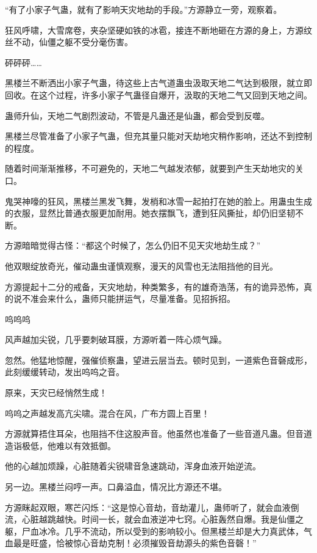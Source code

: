 
\begin{this_body}

“有了小家子气蛊，就有了影响天灾地劫的手段。”方源静立一旁，观察着。

狂风呼啸，大雪席卷，夹杂坚硬如铁的冰雹，接连不断地砸在方源的身上，方源纹丝不动，仙僵之躯不受分毫伤害。

砰砰砰……

黑楼兰不断洒出小家子气蛊，待这些上古气道蛊虫汲取天地二气达到极限，就立即回收。在这个过程，许多小家子气蛊径自爆开，汲取的天地二气又回到天地之间。

蛊师升仙，天地二气剧烈波动，不管是凡蛊还是仙蛊，都会受到反噬。

黑楼兰尽管准备了小家子气蛊，但充其量只能对天劫地灾稍作影响，还达不到控制的程度。

随着时间渐渐推移，不可避免的，天地二气越发浓郁，就要到产生天劫地灾的关口。

鬼哭神嚎的狂风，黑楼兰黑发飞舞，发梢和冰雪一起拍打在她的脸上。用蛊虫生成的衣服，显然比普通衣服更加耐用。她衣摆飘飞，遭到狂风撕扯，却仍旧坚韧不断。

方源暗暗觉得古怪：“都这个时候了，怎么仍旧不见天灾地劫生成？”

他双眼绽放奇光，催动蛊虫谨慎观察，漫天的风雪也无法阻挡他的目光。

方源提起十二分的戒备，天灾地劫，种类繁多，有的雄奇浩荡，有的诡异恐怖，真的说不准会来什么，蛊师只能拼运气，尽量准备。见招拆招。

呜呜呜

风声越加尖锐，几乎要刺破耳膜，方源听着一阵心烦气躁。

忽然。他猛地惊醒，强催侦察蛊，望进云层当去。顿时见到，一道紫色音磬成形，此刻缓缓转动，发出呜呜之音。

原来，天灾已经悄然生成！

呜呜之声越发高亢尖啸。混合在风，广布方圆上百里！

方源就算捂住耳朵，也阻挡不住这股声音。他虽然也准备了一些音道凡蛊。但音道造诣极低，他难以有效抵御。

他的心越加烦躁，心脏随着尖锐啸音急速跳动，浑身血液开始逆流。

另一边。黑楼兰闷哼一声。口鼻溢血，情况比方源还不堪。

方源眯起双眼，寒芒闪烁：“这是惊心音劫，音劫灌儿，蛊师听了，就会血液倒流，心脏越跳越快。时间一长，就会血液逆冲七窍。心脏轰然自爆。我是仙僵之躯，尸血冰冷。几乎不流动，所以受到的影响较小。但黑楼兰却是大力真武体，气血最是旺盛，恰被惊心音劫克制！必须摧毁音劫源头的紫色音磬！”


\end{this_body}
